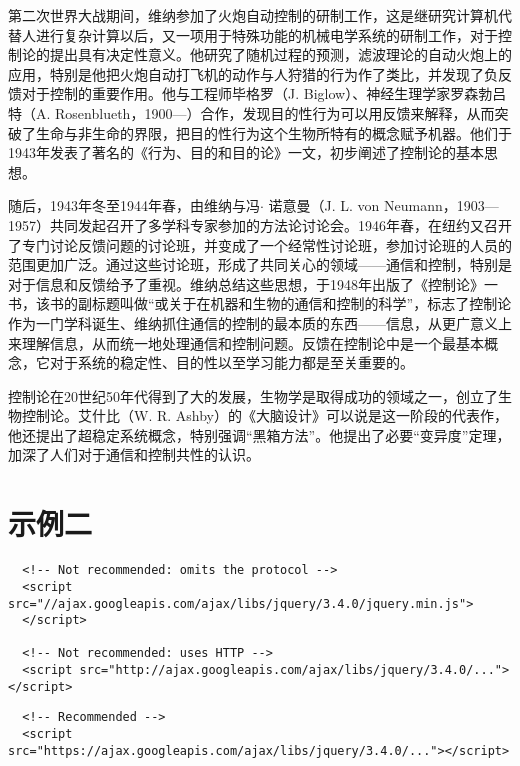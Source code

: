 \documentclass[oneside]{article}
\begin{document}
\begin{tcolorbox}
  第二次世界大战期间，维纳参加了火炮自动控制的研制工作，这是继研究计算机代替人进行复杂计算以后，又一项用于特殊功能的机械电学系统的研制工作，对于控制论的提出具有决定性意义。他研究了随机过程的预测，滤波理论的自动火炮上的应用，特别是他把火炮自动打飞机的动作与人狩猎的行为作了类比，并发现了负反馈对于控制的重要作用。他与工程师毕格罗（J. Biglow）、神经生理学家罗森勃吕特（A. Rosenblueth，1900—）合作，发现目的性行为可以用反馈来解释，从而突破了生命与非生命的界限，把目的性行为这个生物所特有的概念赋予机器。他们于1943年发表了著名的《行为、目的和目的论》一文，初步阐述了控制论的基本思想。

  随后，1943年冬至1944年春，由维纳与冯$\cdot$ 诺意曼（J. L. von Neumann，1903—1957）共同发起召开了多学科专家参加的方法论讨论会。1946年春，在纽约又召开了专门讨论反馈问题的讨论班，并变成了一个经常性讨论班，参加讨论班的人员的范围更加广泛。通过这些讨论班，形成了共同关心的领域——通信和控制，特别是对于信息和反馈给予了重视。维纳总结这些思想，于1948年出版了《控制论》一书，该书的副标题叫做“或关于在机器和生物的通信和控制的科学”，标志了控制论作为一门学科诞生、维纳抓住通信的控制的最本质的东西——信息，从更广意义上来理解信息，从而统一地处理通信和控制问题。反馈在控制论中是一个最基本概念，它对于系统的稳定性、目的性以至学习能力都是至关重要的。

  控制论在20世纪50年代得到了大的发展，生物学是取得成功的领域之一，创立了生物控制论。艾什比（W. R. Ashby）的《大脑设计》可以说是这一阶段的代表作，他还提出了超稳定系统概念，特别强调“黑箱方法”。他提出了必要“变异度”定理，加深了人们对于通信和控制共性的认识。
\end{tcolorbox}


\section{示例二}
\begin{tcolorbox}[
    colback=MistyRose,
    coltext=red,
    colframe=LightGray,
    fontupper=\fontsize{0.9em}{2ex},%
    boxrule=0.5mm,%
  ]
  \begin{verbatim}
  <!-- Not recommended: omits the protocol -->
  <script src="//ajax.googleapis.com/ajax/libs/jquery/3.4.0/jquery.min.js">
  </script>

  <!-- Not recommended: uses HTTP -->
  <script src="http://ajax.googleapis.com/ajax/libs/jquery/3.4.0/..."></script>\end{verbatim}
\end{tcolorbox}

\begin{tcolorbox}[
    colback=white,
    coltext=ForestGreen,
    colframe=LightGray,
    fontupper=\fontsize{0.9em}{2ex},%
    boxrule=0.5mm
  ]
  \begin{verbatim}
  <!-- Recommended -->
  <script src="https://ajax.googleapis.com/ajax/libs/jquery/3.4.0/..."></script>
  \end{verbatim}
\end{tcolorbox}
\end{document}
